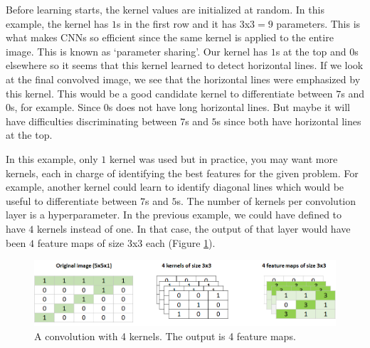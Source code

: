 \documentclass[
  11pt,
]{krantz}
\begin{document}
Before learning starts, the kernel values are initialized at random. In this example, the kernel has \(1\)s in the first row and it has \(3\)x\(3=9\) parameters. This is what makes CNNs so efficient since the same kernel is applied to the entire image. This is known as `parameter sharing'. Our kernel has \(1\)s at the top and \(0\)s elsewhere so it seems that this kernel learned to detect horizontal lines. If we look at the final convolved image, we see that the horizontal lines were emphasized by this kernel. This would be a good candidate kernel to differentiate between \(7\)s and \(0\)s, for example. Since \(0\)s does not have long horizontal lines. But maybe it will have difficulties discriminating between \(7\)s and \(5\)s since both have horizontal lines at the top.

In this example, only \(1\) kernel was used but in practice, you may want more kernels, each in charge of identifying the best features for the given problem. For example, another kernel could learn to identify diagonal lines which would be useful to differentiate between \(7\)s and \(5\)s. The number of kernels per convolution layer is a hyperparameter. In the previous example, we could have defined to have \(4\) kernels instead of one. In that case, the output of that layer would have been \(4\) feature maps of size \(3\)x\(3\) each (Figure \ref{fig:cnn4kernels}).

\begin{figure}

{\centering \includegraphics[width=0.9\linewidth]{images/cnn_4kernels} 

}

\caption{A convolution with 4 kernels. The output is 4 feature maps.}\label{fig:cnn4kernels}
\end{figure}
\end{document}
